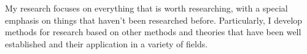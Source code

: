 

My research focuses on everything that is worth researching, with a special emphasis on things that haven’t been
researched before. Particularly, I develop methods for research based on other methods and theories that have been
well established and their application in a variety of fields.
